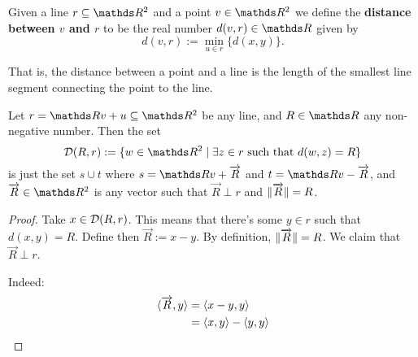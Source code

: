 \begin{df}
	Given a line $r\subseteq \R^2$ and a point $v\in \R^2$ we define the \textbf{distance between $v$ and $r$} to be the real number $d(v,r)\in\R$ given by
	\[d(v,r):=\min_{u\in r}\{d(x,y)\}.\]
	
	That is, the distance between a point and a line is the length of the smallest line segment connecting the point to the line.
\end{df}

\begin{lemma}
	Let $r=\R v+u\subseteq \R^2$ be any line, and $R\in \R$ any non-negative number. Then the set 
	\[\mc D(R,r):=\{w\in \R^2\mid \exists z\in r\mbox{ such that }d(w,z)=R\}\]is just the set $s\cup t$ where $s=\R v+\overrightarrow{R}$ and $t=\R v-\overrightarrow{R}$, and $\overrightarrow{R}\in \R^2$ is any vector such that $\overrightarrow{R}\perp r$ and $\lVert\overrightarrow{R}\rVert=R$.
\end{lemma}
\begin{proof}
	Take $x\in \mathcal D(R,r)$. This means that there's some $y\in r$ such that $d(x,y)=R$. Define then $\overrightarrow{R}:=x-y$. By definition, $\lVert\overrightarrow{R}\rVert=R$. We claim that $\overrightarrow{R}\perp r$.
	
	Indeed:
	\begin{align*}
		\langle \overrightarrow{R},y\rangle&=\langle x-y,y\rangle\\
		&=\langle x,y\rangle-\langle y,y\rangle
	\end{align*}
\end{proof}
